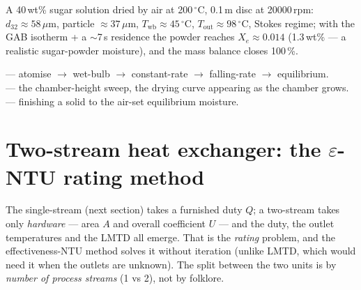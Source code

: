 \documentclass[11pt,a4paper]{article}
\begin{document}
\begin{example}
A 40\,wt\% sugar solution dried by air at 200\,$^\circ$C, 0.1\,m disc at
20000\,rpm: $d_{32}\approx 58\,\mu$m, particle $\approx 37\,\mu$m,
$T_{\text{wb}}\approx 45\,^\circ$C, $T_{\text{out}}\approx 98\,^\circ$C,
Stokes regime; with the GAB isotherm + a $\sim$7\,s residence the powder
reaches $X_e\approx 0.014$ (1.3\,wt\% --- a realistic sugar-powder
moisture), and the mass balance closes 100\,\%.
\end{example}

\begin{tutoriallink}
 --- atomise $\to$ wet-bulb
$\to$ constant-rate $\to$ falling-rate $\to$ equilibrium. \\
 --- the chamber-height sweep, the
drying curve appearing as the chamber grows. \\
 --- finishing a solid to the
air-set equilibrium moisture.
\end{tutoriallink}

\section{Two-stream heat exchanger: the $\varepsilon$-NTU rating
method}\label{ch:hx-entu}

\begin{whatyoulllearn}
The single-stream  (next section) takes a furnished duty
$Q$; a two-stream  takes only \emph{hardware} ---
area $A$ and overall coefficient $U$ --- and the duty, the outlet
temperatures and the LMTD all emerge.  That is the \emph{rating}
problem, and the effectiveness-NTU method solves it without iteration
(unlike LMTD, which would need it when the outlets are unknown).  The
split between the two units is by \emph{number of process streams}
(1 vs 2), not by folklore.
\end{whatyoulllearn}
\end{document}
